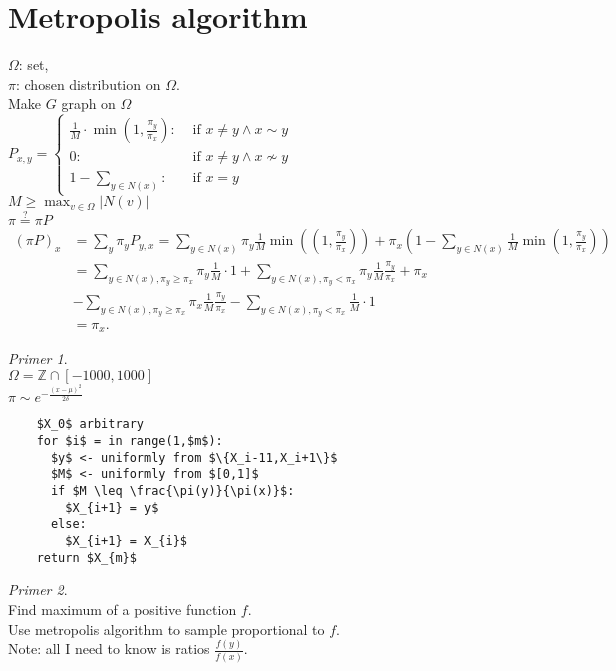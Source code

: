 \documentclass[a4paper, 12pt]{book}
\theoremstyle{definition}
\theoremstyle{remark}
\newtheorem*{ex}{Primer}
\newcommand{\Z}{\mathbb{Z}}
\begin{document}
\section{Metropolis algorithm}

$\Omega$: set, \\
$\pi$: chosen distribution on $\Omega$. \\
Make $G$ graph on $\Omega$ \\
$P_{x,y} = \begin{cases}
  \frac{1}{M} \cdot \min \left(1, \frac{\pi_y}{\pi_x}\right): &\text{ if } x \neq y \land x \sim y \\
  0: &\text{ if } x \neq y \land x \nsim y \\
  1 - \sum_{y \in N(x)}: &\text{ if } x = y
\end{cases}$ \\
$M \geq \max_{v \in \Omega} |N(v)|$ \\
$\pi \stackrel{?}{=} \pi P$
\begin{align*}
  (\pi P)_x &= \sum_y \pi_y P_{y,x} =
    \sum_{y \in N(x)} \pi_y \frac{1}{M} \min \left(\left(1, \frac{\pi_y}{\pi_x}\right)\right)
    + \pi_x \left(1 - \sum_{y \in N(x)} \frac{1}{M} \min \left(1, \frac{\pi_y}{\pi_x}\right)\right) \\
  &= \sum_{y \in N(x), \pi_y \geq \pi_x} \pi_y \frac{1}{M} \cdot 1 +
    \sum_{y \in N(x), \pi_y < \pi_x} \pi_y \frac{1}{M} \frac{\pi_y}{\pi_x} + \pi_x \\
  &- \sum_{y \in N(x), \pi_y \geq \pi_x} \pi_x \frac{1}{M} \frac{\pi_y}{\pi_x} -
    \sum_{y \in N(x), \pi_y < \pi_x} \frac{1}{M} \cdot 1 \\
  &= \pi_x.
\end{align*}
\begin{ex} \text{} \\
  $\Omega = \Z \cap [-1000,1000]$ \\
  $\pi \sim e^{-\frac{(x-\mu)^2}{2 \delta}}$ \\
  \begin{lstlisting}
    $X_0$ arbitrary
    for $i$ = in range(1,$m$):
      $y$ <- uniformly from $\{X_i-11,X_i+1\}$
      $M$ <- uniformly from $[0,1]$
      if $M \leq \frac{\pi(y)}{\pi(x)}$:
        $X_{i+1} = y$
      else:
        $X_{i+1} = X_{i}$
    return $X_{m}$
  \end{lstlisting}
\end{ex}
\begin{ex} \text{} \\
  Find maximum of a positive function $f$. \\
  Use metropolis algorithm to sample proportional to $f$. \\
  Note: all I need to know is ratios $\frac{f(y)}{f(x)}$.
\end{ex}
\end{document}
